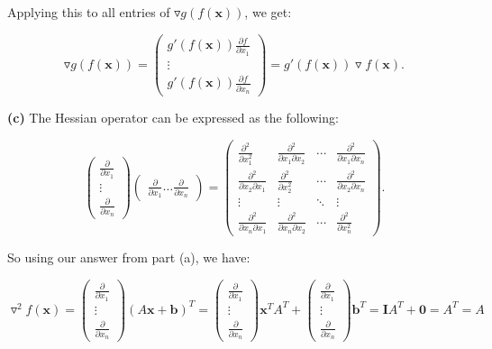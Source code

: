 \documentclass{article}
\begin{document}
Applying this to all entries of $\triangledown g(f(\mathbf{x}))$, we get:

$$\triangledown g(f(\mathbf{x})) =
\begin{pmatrix}
  g'(f(\mathbf{x})) \frac{\partial f}{\partial x_1}\\
  \vdots\\
  g'(f(\mathbf{x})) \frac{\partial f}{\partial x_n}
\end{pmatrix} = g'(f(\mathbf{x})) \triangledown f(\mathbf{x}).$$

\textbf{(c)} The Hessian operator can be expressed as the following:

$$
\begin{pmatrix}
  \frac{\partial}{\partial x_1} \\
  \vdots\\
  \frac{\partial}{\partial x_n}
\end{pmatrix} 
\begin{pmatrix}
  \frac{\partial}{\partial x_1} \dots \frac{\partial}{\partial x_n}
\end{pmatrix}
= \begin{pmatrix}
  \frac{\partial^2}{\partial x_1^2} & \frac{\partial^2}{\partial x_1 \partial x_2} & \cdots & \frac{\partial^2}{\partial x_1 \partial x_n}\\
  \frac{\partial^2}{\partial x_2 \partial x_1} & \frac{\partial^2}{\partial x_2^2} & \cdots & \frac{\partial^2}{\partial x_2 \partial x_n}\\
  \vdots & \vdots & \ddots & \vdots\\
  \frac{\partial^2}{\partial x_n \partial x_1} & \frac{\partial^2}{\partial x_n \partial x_2} & \cdots & \frac{\partial^2}{\partial x_n^2} 
\end{pmatrix}.$$

So using our answer from part (a), we have:

$$
\triangledown^2 f(\mathbf{x}) =
\begin{pmatrix}
  \frac{\partial}{\partial x_1} \\
  \vdots\\
  \frac{\partial}{\partial x_n}
\end{pmatrix}
(A \mathbf{x} + \mathbf{b})^T 
= %
\begin{pmatrix}
  \frac{\partial}{\partial x_1} \\
  \vdots\\
  \frac{\partial}{\partial x_n}
\end{pmatrix}
\mathbf{x}^TA^T + 
\begin{pmatrix}
  \frac{\partial}{\partial x_1} \\
  \vdots\\
  \frac{\partial}{\partial x_n}
\end{pmatrix}
\mathbf{b}^T 
= 
\mathbf{I}
A^T
+
\mathbf{0}
= A^T
= A
$$
\end{document}
